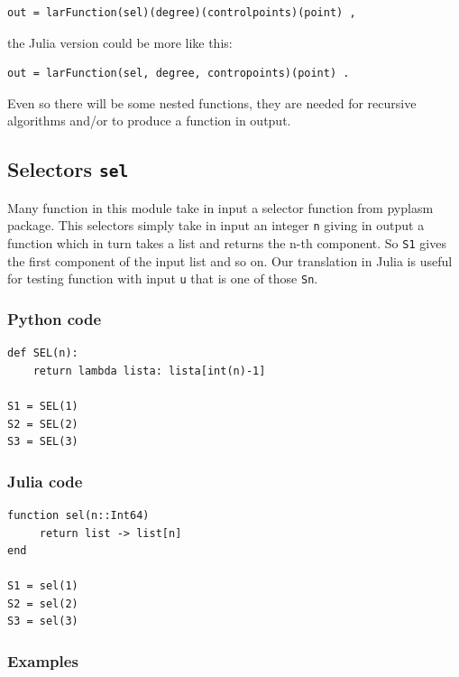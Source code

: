 \documentclass[a4paper,11pt]{article}
\begin{document}
\begin{verbatim}
out = larFunction(sel)(degree)(controlpoints)(point) ,
\end{verbatim}

the Julia version could be more like this:

\begin{verbatim}
out = larFunction(sel, degree, contropoints)(point) .
\end{verbatim}

Even so there will be some nested functions, they are needed for recursive algorithms and/or to produce a function in output.

\subsection{Selectors \texttt{sel}}
\label{sec: sel}

Many function in this module take in input a selector function from pyplasm package. This selectors simply take in input an integer \texttt{n} giving in output a function which in turn takes a list and returns the n-th component. So \texttt{S1} gives the first component of the input list and so on. Our translation in Julia is useful for testing function with input \texttt{u} that is one of those \texttt{Sn}.

\subsubsection{Python code}

\begin{verbatim}
def SEL(n):
    return lambda lista: lista[int(n)-1]

S1 = SEL(1)
S2 = SEL(2)
S3 = SEL(3)
\end{verbatim}

\subsubsection{Julia code}

\begin{verbatim}
function sel(n::Int64)
     return list -> list[n]
end

S1 = sel(1)
S2 = sel(2)
S3 = sel(3)
\end{verbatim}

\subsubsection{Examples}
\end{document}
